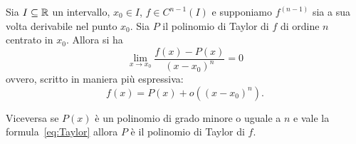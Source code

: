\begin{theorem}
\label{th:taylor_peano}
\mymark{***}%
Sia $I\subseteq {\mathbb R}$ un intervallo, $x_0\in I$, $f\in C^{n-1}(I)$ 
e supponiamo $f^{(n-1)}$
sia a sua volta derivabile nel punto $x_0$.
%
Sia $P$ il polinomio di Taylor di $f$ di ordine $n$ centrato in $x_0$. Allora si ha
\begin{equation}\label{eq:taylor_peano}
  \lim_{x\to x_0}\frac{f(x) - P(x)}{(x-x_0)^n} = 0
\end{equation}
ovvero, scritto in maniera più espressiva:
\begin{equation}\label{eq:Taylor}
  f(x) = P(x) + o((x-x_0)^n).
\end{equation}

Viceversa se $P(x)$ è un polinomio di grado minore o uguale a $n$ e vale la
formula~\eqref{eq:Taylor} allora $P$ è il polinomio di Taylor di $f$.
\end{theorem}
%
